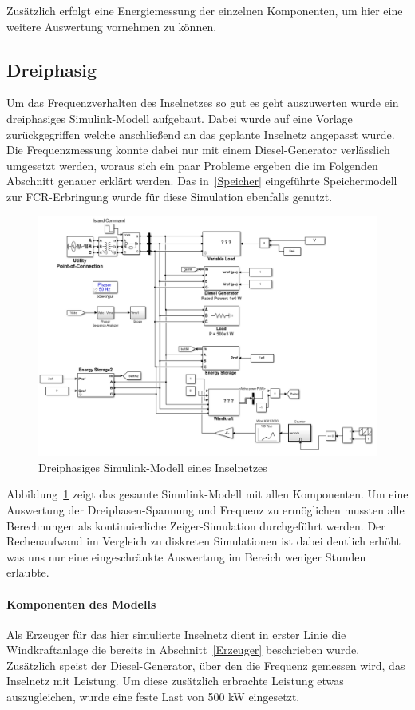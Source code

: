 Zusätzlich erfolgt eine Energiemessung der einzelnen Komponenten, um hier eine weitere Auswertung vornehmen zu können.

\subsection{Dreiphasig}\label{3phase}
Um das Frequenzverhalten des Inselnetzes so gut es geht auszuwerten wurde ein dreiphasiges Simulink-Modell aufgebaut.
Dabei wurde auf eine Vorlage zurückgegriffen welche anschließend an das geplante Inselnetz angepasst wurde.
Die Frequenzmessung konnte dabei nur mit einem Diesel-Generator verlässlich umgesetzt werden, woraus sich ein paar Probleme ergeben
die im Folgenden Abschnitt genauer erklärt werden.
Das in~\ref{Speicher} eingeführte Speichermodell zur FCR-Erbringung wurde für diese Simulation ebenfalls genutzt.

\begin{figure}[h!]
	\centering
	\includegraphics[width=14cm]{Abbildungen/Dreiphasig.png}
	\caption{Dreiphasiges Simulink-Modell eines Inselnetzes}\label{Mod:3phase}
\end{figure}

Abbildung~\ref{Mod:3phase} zeigt das gesamte Simulink-Modell mit allen Komponenten.
Um eine Auswertung der Dreiphasen-Spannung und Frequenz zu ermöglichen mussten alle Berechnungen als kontinuierliche Zeiger-Simulation 
durchgeführt werden.
Der Rechenaufwand im Vergleich zu diskreten Simulationen ist dabei deutlich erhöht was uns nur eine eingeschränkte
Auswertung im Bereich weniger Stunden erlaubte.

\paragraph{Komponenten des Modells}
Als Erzeuger für das hier simulierte Inselnetz dient in erster Linie die Windkraftanlage die bereits in Abschnitt~\ref{Erzeuger} beschrieben wurde.
Zusätzlich speist der Diesel-Generator, über den die Frequenz gemessen wird, das Inselnetz mit Leistung.
Um diese zusätzlich erbrachte Leistung etwas auszugleichen, wurde eine feste Last von 500 kW eingesetzt.

